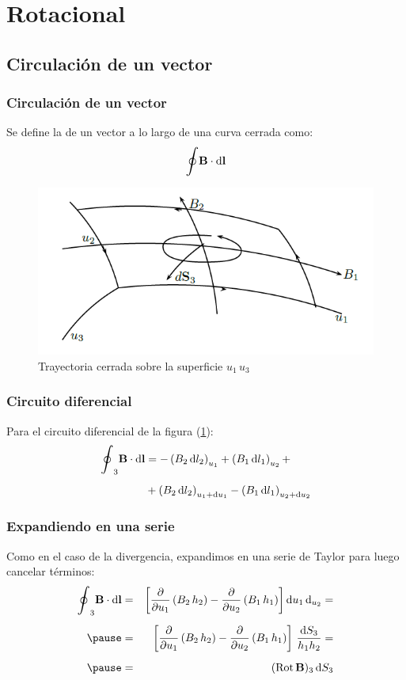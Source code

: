 \documentclass[12pt]{beamer}
\begin{document}
\section{Rotacional}
\subsection{Circulación de un vector}

\begin{frame}
\frametitle{Circulación de un vector}
Se define la  de un vector a lo largo de una curva cerrada como:
\pause
\begin{align*}
\scaleoint{6ex} \vb{B} \cdot \dd{\vb{l}}
\end{align*}
\pause
\begin{figure}[h!]
    \centering
    \includegraphics[scale=0.4]{Imagenes/Circulacion_Vector.png}
    \caption{Trayectoria cerrada sobre la superficie $u_{1} \, u_{3}$}
    \label{fig:figura_trayectoria_cerrada}
\end{figure}
\end{frame}
\begin{frame}
\frametitle{Circuito diferencial}
Para el circuito diferencial de la figura (\ref{fig:figura_trayectoria_cerrada}):
\pause
\begin{align*}
\scaleoint{6ex}_{3} \vb{B} \cdot \dd{\vb{l}} &= - \left( B_{2} \dd{l_{2}} \right)_{u_{1}} + \left( B_{1} \dd{l_{1}} \right)_{u_{2}} + \\[0.5em]
&+ \left( B_{2} \dd{l_{2}} \right)_{u_{1}+\dd{u_{1}}} - \left( B_{1} \dd{l_{1}} \right)_{u_{2}+\dd{u_{2}}}
\end{align*}
\end{frame}
\begin{frame}
\frametitle{Expandiendo en una serie}
Como en el caso de la divergencia, expandimos en una serie de Taylor para luego cancelar términos:
\pause
\begin{eqnarray*}
\scaleoint{6ex}_{3} \vb{B} \cdot \dd{\vb{l}} &=& \left[ \displaystyle \pdv{u_{1}} \left( B_{2} \, h_{2}\right) - \pdv{u_{2}} \left( B_{1} \, h_{1} \right) \right] \dd{u_{1}} \dd_{u_{2}} = \\[0.5em] \pause
&=& \left[ \pdv{u_{1}} \left( B_{2} \, h_{2}\right) - \pdv{u_{2}} \left( B_{1} \, h_{1} \right) \right] \, \dfrac{\dd{S_{3}}}{h_{1} h_{2}} = \\[0.5em] \pause
&=& ({\rm{Rot}} \, \vb{B})_{3} \dd{S_{3}}
\end{eqnarray*}
\end{frame}
\end{document}
